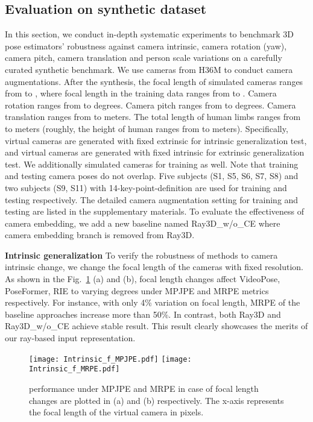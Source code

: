 \documentclass[10pt,twocolumn,letterpaper]{article}
\begin{document}
\subsection{Evaluation on synthetic dataset}
In this section, we conduct in-depth systematic experiments to benchmark 3D pose estimators' robustness against camera intrinsic, camera rotation (yaw), camera pitch, camera translation and person scale variations on a carefully curated synthetic benchmark. We use cameras from H36M to conduct camera augmentations. After the synthesis, the focal length of simulated cameras ranges from  to , where focal length in the training data ranges from  to .  Camera rotation ranges from  to  degrees. Camera pitch ranges from  to  degrees. Camera translation ranges from  to  meters. The total length of human limbs ranges from  to  meters (roughly, the height of human ranges from  to  meters). Specifically,  virtual cameras are generated with fixed extrinsic for intrinsic generalization test, and  virtual cameras are generated with fixed intrinsic for extrinsic generalization test. We additionally simulated  cameras for training as well. Note that training and testing camera poses do not overlap. Five subjects (S1, S5, S6, S7, S8) and two subjects (S9, S11) with 14-key-point-definition are used for training and testing respectively. The detailed camera augmentation setting for training and testing are listed in the supplementary materials. To evaluate the effectiveness of camera embedding, we add a new baseline named Ray3D\_w/o\_CE where camera embedding branch is removed from Ray3D.
\label{subsec: exp_4_4}

\noindent\textbf{Intrinsic generalization}
To verify the robustness of methods to camera intrinsic change, we change the focal length of the cameras with fixed resolution. As shown in the Fig.~\ref{fig:Intrinsic} (a) and (b), focal length changes affect VideoPose, PoseFormer, RIE to varying degrees under MPJPE and MRPE metrics respectively. For instance, with only 4\% variation on focal length, MRPE of the baseline approaches increase more than 50\%. In contrast, both Ray3D and Ray3D\_w/o\_CE achieve stable result. This result clearly showcases the merits of our ray-based input representation. 


\begin{figure}
  \centering
  \texttt{[image: Intrinsic\_f\_MPJPE.pdf]}
  \texttt{[image: Intrinsic\_f\_MRPE.pdf]}
\vskip-9pt
  \caption{performance under MPJPE and MRPE in case of focal length changes are plotted in (a) and (b) respectively. The x-axis represents the focal length of the virtual camera in pixels.}
\label{fig:Intrinsic}
  \vspace{-4mm}
\end{figure}
\end{document}
